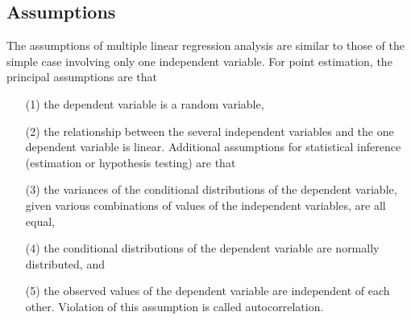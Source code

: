 \documentclass[12pt]{article}
\begin{document}
\subsection*{Assumptions}
The assumptions of multiple linear regression analysis are similar to those of the simple case involving only one independent variable. For point estimation, the principal assumptions are that
\begin{itemize}
\item[(1)] the dependent variable is a random variable,
\item[(2)] the relationship between the several independent variables and the one dependent variable is linear.
Additional assumptions for statistical inference (estimation or hypothesis testing) are that
\item[(3)] the variances of the conditional distributions of the dependent variable, given various combinations of values of the independent variables, are all equal,
\item[(4)] the conditional distributions of the dependent variable
are normally distributed, and
\item[(5)] the observed values of the dependent variable are independent of each other. Violation of this assumption is called autocorrelation.
\end{itemize}
\end{document}
